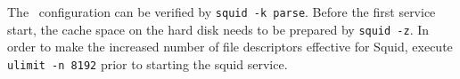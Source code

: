 The \squid\ configuration can be verified by \texttt{squid -k parse}.
Before the first service start, the cache space on the hard disk needs to be prepared by \texttt{squid -z}.
In order to make the increased number of file descriptors effective for Squid, execute \texttt{ulimit -n 8192} prior to starting the squid service.
